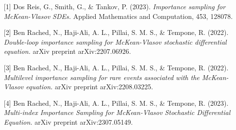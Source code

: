 \begin{talk}
\begin{enumerate}
	\item[{[1]}] Dos Reis, G., Smith, G., \& Tankov, P. (2023). {\it Importance sampling for McKean-Vlasov SDEs.} Applied Mathematics and Computation, 453, 128078.
	\item[{[2]}] Ben Rached, N., Haji-Ali, A. L., Pillai, S. M. S., \& Tempone, R. (2022). {\it Double-loop importance sampling for McKean-Vlasov stochastic differential equation.} arXiv preprint arXiv:2207.06926.
	\item[{[3]}] Ben Rached, N., Haji-Ali, A. L., Pillai, S. M. S., \& Tempone, R. (2022). {\it Multilevel importance sampling for rare events associated with the McKean-Vlasov equation.} arXiv preprint arXiv:2208.03225.
	\item[{[4]}] Ben Rached, N., Haji-Ali, A. L., Pillai, S. M. S., \& Tempone, R. (2023). {\it Multi-index Importance Sampling for McKean-Vlasov Stochastic Differential Equation.} arXiv preprint arXiv:2307.05149.
\end{enumerate}

\end{talk}

